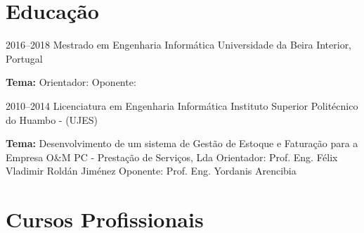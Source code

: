 \section{Educação}

\begin{entrada}

\lista
{2016--2018}
{Mestrado {\normalfont em Engenharia Informática }}
{Universidade da Beira Interior, Portugal}
{\vspace{-0.3cm}}

\dissert
{}
{\textbf{Tema:} }
{Orientador: {\normalfont {}}}
{Oponente: {\normalfont {}}}
{\vspace{-0.3cm}}



\lista
{2010--2014}
{Licenciatura {\normalfont em Engenharia Informática }}
{Instituto Superior Politécnico do Huambo - (UJES)}
{\vspace{-0.3cm}}

\dissert
{}
{\textbf{Tema:} Desenvolvimento de um sistema de Gestão de Estoque e Faturação para a Empresa O\&M PC - Prestação de Serviços, Lda}
{Orientador: {\normalfont Prof. Eng. Félix Vladimir Roldán Jiménez}}
{Oponente: {\normalfont Prof. Eng. Yordanis Arencibia}}
{\vspace{-0.3cm}}

\end{entrada}

\vspace{-1.3cm}
\newpage
\section{Cursos Profissionais}

